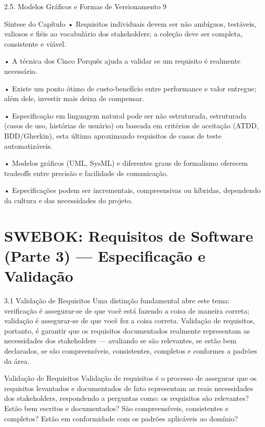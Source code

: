 2.5. Modelos Gráficos e Formas de Versionamento 9

Síntese do Capítulo • Requisitos individuais devem ser não ambíguos, testáveis, valiosos e fiéis ao vocabulário dos stakeholders; a coleção deve ser completa, consistente e viável.

• A técnica dos Cinco Porquês ajuda a validar se um requisito é realmente necessário.

• Existe um ponto ótimo de custo-benefício entre performance e valor entregue; além dele, investir mais deixa de compensar.

• Especificação em linguagem natural pode ser não estruturada, estruturada (casos de uso, histórias de usuário) ou baseada em critérios de aceitação (ATDD, BDD/Gherkin), esta última aproximando requisitos de casos de teste automatizáveis.

• Modelos gráficos (UML, SysML) e diferentes graus de formalismo oferecem tradeoffs entre precisão e facilidade de comunicação.

• Especificações podem ser incrementais, compreensivas ou híbridas, dependendo da cultura e das necessidades do projeto.

\chapter{SWEBOK: Requisitos de Software (Parte 3) — Especificação e Validação}

3.1 Validação de Requisitos Uma distinção fundamental abre este tema: verificação é assegurar-se de que você está fazendo a coisa de maneira correta; validação é assegurar-se de que você fez a coisa correta. Validação de requisitos, portanto, é garantir que os requisitos documentados realmente representam as necessidades dos stakeholders — avaliando se são relevantes, se estão bem declarados, se são compreensíveis, consistentes, completos e conformes a padrões da área.

Validação de Requisitos Validação de requisitos é o processo de assegurar que os requisitos levantados e documentados de fato representam as reais necessidades dos stakeholders, respondendo a perguntas como: os requisitos são relevantes? Estão bem escritos e documentados? São compreensíveis, consistentes e completos? Estão em conformidade com os padrões aplicáveis ao domínio?

